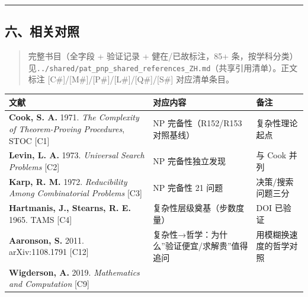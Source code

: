\documentclass[
]{article}
\newcounter{none} %
\begin{document}
\begin{center}\rule{0.5\linewidth}{0.5pt}\end{center}

\subsection{六、相关对照}\label{ux516dux76f8ux5173ux5bf9ux7167}

\begin{quote}
完整书目（全字段 + 验证记录 + 健在/已故标注，85+
条，按学科分类）见\texttt{../shared/pat\_pnp\_shared\_references\_ZH.md}（共享引用清单）。正文标注
{[}C\#{]}/{[}M\#{]}/{[}P\#{]}/{[}L\#{]}/{[}Q\#{]}/{[}S\#{]}
对应清单条目。
\end{quote}

{\def\LTcaptype{none} %
\begin{longtable}[]{@{}
 >{\raggedright\arraybackslash}p{}
 >{\raggedright\arraybackslash}p{}
 >{\raggedright\arraybackslash}p{}@{}}
\toprule\noalign{}
\begin{minipage}[b]{\linewidth}\raggedright
文献
\end{minipage} & \begin{minipage}[b]{\linewidth}\raggedright
对应内容
\end{minipage} & \begin{minipage}[b]{\linewidth}\raggedright
备注
\end{minipage} \\
\midrule\noalign{}
\endhead
\bottomrule\noalign{}
\endlastfoot
\textbf{Cook, S. A.} 1971. \emph{The Complexity of Theorem-Proving
Procedures}, STOC {[}C1{]} & NP 完备性（R152/R153 对照基线） &
复杂性理论起点 \\
\textbf{Levin, L. A.} 1973. \emph{Universal Search Problems} {[}C2{]} &
NP 完备性独立发现 & 与 Cook 并列 \\
\textbf{Karp, R. M.} 1972. \emph{Reducibility Among Combinatorial
Problems} {[}C3{]} & NP 完备性 21 问题 & 决策/搜索问题三分 \\
\textbf{Hartmanis, J., Stearns, R. E.} 1965. TAMS {[}C4{]} &
复杂性层级奠基（步数度量） & DOI 已验证 \\
\textbf{Aaronson, S.} 2011. arXiv:1108.1791 {[}C12{]} &
复杂性→哲学：为什么''验证便宜/求解贵''值得追问 &
用模糊换速度的哲学对照 \\
\textbf{Wigderson, A.} 2019. \emph{Mathematics and Computation} {[}C9{]}

\end{longtable}}
\end{document}
